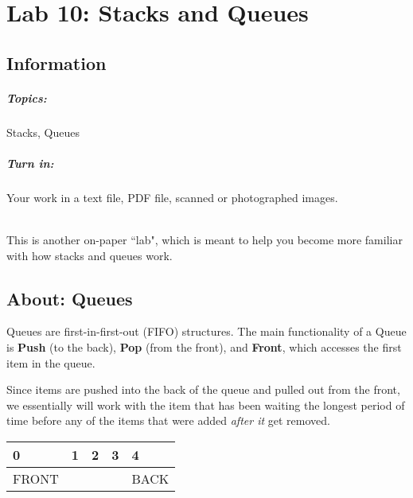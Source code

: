 \documentclass[a4paper,12pt,oneside]{book}
\title{}
\author{Rachel Morris}
\date{\today}
\newcommand{\laLab}{Lab 10: Stacks and Queues\ }
\begin{document}
    \chapter*{\laLab} 

        \section{Information}
            \paragraph{ Topics: } Stacks, Queues
            \paragraph{ Turn in: } Your work in a text file, PDF file, scanned or photographed images.
            

~\\
This is another on-paper ``lab", which is meant to help you become
more familiar with how stacks and queues work.

    \hrulefill

    \section{About: Queues}

        Queues are first-in-first-out (FIFO) structures. The main
        functionality of a Queue is \textbf{Push} (to the back),
        \textbf{Pop} (from the front), and \textbf{Front}, which accesses the first
        item in the queue.

        Since items are pushed into the back of the queue and pulled out
        from the front, we essentially will work with the item that has
        been waiting the longest period of time before any of the items
        that were added \textit{after it} get removed.

        \begin{center}
            \begin{tabular}{ | p{2cm} | p{2cm} | p{2cm} | p{2cm} | p{2cm} |}
                \hline
                0 & 1 & 2 & 3 & 4
                \\ \hline
                FRONT & & & & BACK
                \\ \hline
            \end{tabular}
        \end{center}
\end{document}
